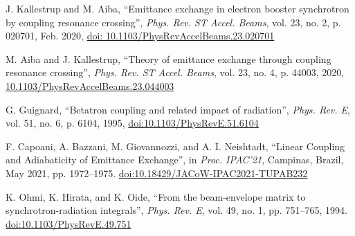\documentclass[a4paper,
               keeplastbox,   %
              nospread,     %
               ]{jacow}
\begin{document}
{\begin{thebibliography}{99}
  J. Kallestrup and M. Aiba,
  \textquotedblleft{Emittance exchange in electron booster synchrotron by coupling resonance crossing}\textquotedblright,
  \emph{Phys. Rev. ST Accel. Beams}, vol. 23, no. 2, p. 020701, Feb. 2020, 
  \url{doi: 10.1103/PhysRevAccelBeams.23.020701}
    
    M. Aiba and J. Kallestrup,
    \textquotedblleft{Theory of emittance exchange
    through coupling resonance crossing}\textquotedblright,
    \emph{Phys. Rev. ST Accel. Beams}, vol. 23, no. 4, p. 44003, 2020, 
    \url{10.1103/PhysRevAccelBeams.23.044003}
    
    G. Guignard,
    \textquotedblleft{Betatron coupling and related impact of radiation}\textquotedblright,
    \emph{Phys. Rev. E}, vol. 51, no. 6, p. 6104, 1995, 
    \url{doi:10.1103/PhysRevE.51.6104}
    
   F. Capoani, A. Bazzani, M. Giovannozzi, and A. I. Neishtadt,
   \textquotedblleft{Linear Coupling and Adiabaticity of Emittance Exchange}\textquotedblright,
   in \emph{Proc. IPAC’21}, Campinas, Brazil, May 2021, pp. 1972--1975.
   \url{doi:10.18429/JACoW-IPAC2021-TUPAB232}
   
   
    K. Ohmi, K. Hirata, and K. Oide, 
     \textquotedblleft{From the beam-envelope matrix to synchrotron-radiation integrals}\textquotedblright,
    \emph{Phys. Rev. E}, vol. 49, no. 1, pp. 751–765, 1994.
    \url{doi:10.1103/PhysRevE.49.751}
    
    
	\end{thebibliography}
} 
%
% 

%
\end{document}
